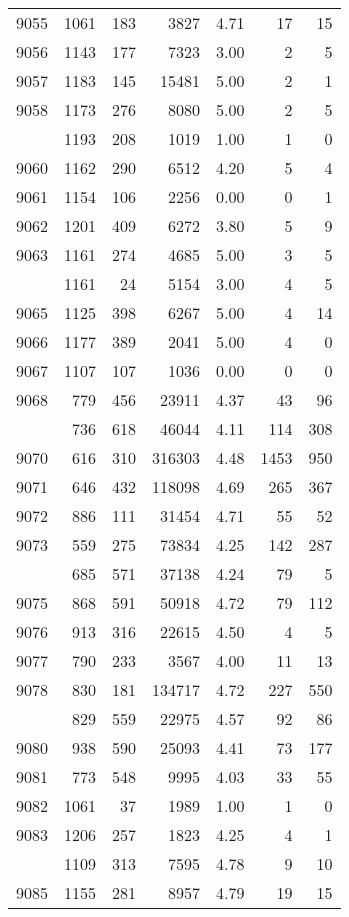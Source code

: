 \documentclass[
]{article}
\begin{document}
\begin{table}
\begin{tabular}[t]{lrrrrrr}
9055 & 1061 & 183 & 3827 & 4.71 & 17 & 15\\
9056 & 1143 & 177 & 7323 & 3.00 & 2 & 5\\
9057 & 1183 & 145 & 15481 & 5.00 & 2 & 1\\
9058 & 1173 & 276 & 8080 & 5.00 & 2 & 5\\
\addlinespace
9059 & 1193 & 208 & 1019 & 1.00 & 1 & 0\\
9060 & 1162 & 290 & 6512 & 4.20 & 5 & 4\\
9061 & 1154 & 106 & 2256 & 0.00 & 0 & 1\\
9062 & 1201 & 409 & 6272 & 3.80 & 5 & 9\\
9063 & 1161 & 274 & 4685 & 5.00 & 3 & 5\\
\addlinespace
9064 & 1161 & 24 & 5154 & 3.00 & 4 & 5\\
9065 & 1125 & 398 & 6267 & 5.00 & 4 & 14\\
9066 & 1177 & 389 & 2041 & 5.00 & 4 & 0\\
9067 & 1107 & 107 & 1036 & 0.00 & 0 & 0\\
9068 & 779 & 456 & 23911 & 4.37 & 43 & 96\\
\addlinespace
9069 & 736 & 618 & 46044 & 4.11 & 114 & 308\\
9070 & 616 & 310 & 316303 & 4.48 & 1453 & 950\\
9071 & 646 & 432 & 118098 & 4.69 & 265 & 367\\
9072 & 886 & 111 & 31454 & 4.71 & 55 & 52\\
9073 & 559 & 275 & 73834 & 4.25 & 142 & 287\\
\addlinespace
9074 & 685 & 571 & 37138 & 4.24 & 79 & 5\\
9075 & 868 & 591 & 50918 & 4.72 & 79 & 112\\
9076 & 913 & 316 & 22615 & 4.50 & 4 & 5\\
9077 & 790 & 233 & 3567 & 4.00 & 11 & 13\\
9078 & 830 & 181 & 134717 & 4.72 & 227 & 550\\
\addlinespace
9079 & 829 & 559 & 22975 & 4.57 & 92 & 86\\
9080 & 938 & 590 & 25093 & 4.41 & 73 & 177\\
9081 & 773 & 548 & 9995 & 4.03 & 33 & 55\\
9082 & 1061 & 37 & 1989 & 1.00 & 1 & 0\\
9083 & 1206 & 257 & 1823 & 4.25 & 4 & 1\\
\addlinespace
9084 & 1109 & 313 & 7595 & 4.78 & 9 & 10\\
9085 & 1155 & 281 & 8957 & 4.79 & 19 & 15\\

\end{tabular}
\end{table}
\end{document}
